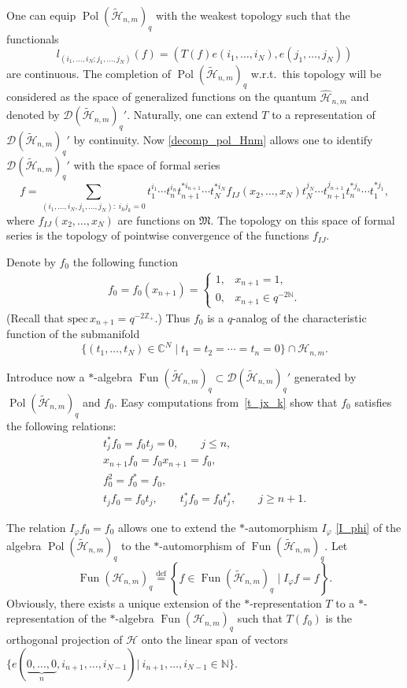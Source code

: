 One can equip $\operatorname{Pol}(\widetilde{\mathscr{H}}_{n,m})_q$ with the weakest topology such that the
functionals
\[
l_{(i_1,\ldots,i_N;j_1,\ldots,j_N)}(f)=(T(f)e(i_1,\ldots,i_N),e(j_1,\ldots,j_N))
\]
are continuous. The completion of $\operatorname{Pol}(\widetilde{\mathscr{H}}_{n,m})_q$ w.r.t.\ this topology
will be considered as the space of generalized functions on the quantum $\widehat{\mathscr{H}}_{n,m}$ and
denoted by $\mathscr{D}(\widetilde{\mathscr{H}}_{n,m})_q'$. Naturally, one can extend $T$ to a representation
of $\mathscr{D}(\widetilde{\mathscr{H}}_{n,m})_q'$ by continuity. Now \eqref{decomp_pol_Hnm} allows one to
identify $\mathscr{D}(\widetilde{\mathscr{H}}_{n,m})_q'$ with the space of formal series
\[
f=\sum_{(i_1,\ldots,i_N,j_1,\ldots,j_N):\;i_kj_k=0} t_1^{i_1}\cdots
t_n^{i_n}t_{n+1}^{*i_{n+1}}\cdots t_N^{*i_N}f_{IJ}(x_2,\ldots,x_N)t_N^{j_N}\cdots
t_{n+1}^{j_{n+1}}t_n^{*j_n}\cdots t_1^{*j_1},
\]
where $f_{IJ}(x_2,\ldots,x_N)$ are functions on $\mathfrak{M}$. The topology on this space of formal series
is the topology of pointwise convergence of the functions $f_{IJ}$.


Denote by $f_0$ the following function
\begin{gather}\label{f_0(x_n+1)}
f_0=f_0(x_{n+1})=
\begin{cases}
1, & x_{n+1}=1,
\\ 0, & x_{n+1}\in q^{-2\mathbb{N}}.
\end{cases}
\end{gather}
(Recall that $\mathrm{spec}\,x_{n+1}=q^{-2\mathbb{Z}_+}$.) Thus $f_0$ is a $q$-analog of the characteristic
function of the submanifold
\[
\big\{ (t_1,\ldots,t_N)\in\mathbb{C}^N\; \big|\;t_1=t_2=\cdots=t_n=0 \big\}\cap\mathscr{H}_{n,m}.
\]

Introduce now a $*$-algebra $\operatorname{Fun}(\widetilde{\mathscr{H}}_{n,m})_q \subset
\mathscr{D}(\widetilde{\mathscr{H}}_{n,m})_q'$ generated by
$\operatorname{Pol}(\widetilde{\mathscr{H}}_{n,m})_q$ and $f_0$. Easy computations from~\eqref{t_jx_k} show
that $f_0$ satisf\/ies the following relations:
\begin{gather*}
 t_j^*f_0=f_0t_j=0,\qquad j\le n,
\\  x_{n+1}f_0=f_0x_{n+1}=f_0,
\\  f_0^2=f_0^*=f_0,
\\  t_jf_0=f_0t_j,\qquad t_j^*f_0=f_0t_j^*,\qquad j\ge n+1.
\end{gather*}

The relation $I_\varphi f_0=f_0$ allows one to extend the $*$-automorphism $I_\varphi$ \eqref{I_phi} of the
algebra $\operatorname{Pol}(\widetilde{\mathscr{H}}_{n,m})_q$ to the $*$-automorphism of
$\operatorname{Fun}(\widetilde{\mathscr{H}}_{n,m})_q$. Let
\[
\operatorname{Fun}(\mathscr{H}_{n,m})_q\overset{\mathrm{def}}{=} \left\{ f\in
\operatorname{Fun}(\widetilde{\mathscr{H}}_{n,m})_q\;\big|\; I_\varphi f=f\right\}.
\]
Obviously, there exists a unique extension of the $*$-representation $T$ to a $*$-representation of the
$*$-algebra $\operatorname{Fun}(\mathscr{H}_{n,m})_q$ such that $T(f_0)$ is the orthogonal projection of
$\mathscr{H}$ onto the linear span of vectors $\{e(\underbrace{0,\ldots,0}_n,i_{n+1},\ldots,i_{N-1})|\:
i_{n+1},\ldots,i_{N-1}\in\mathbb{N}\}$.



